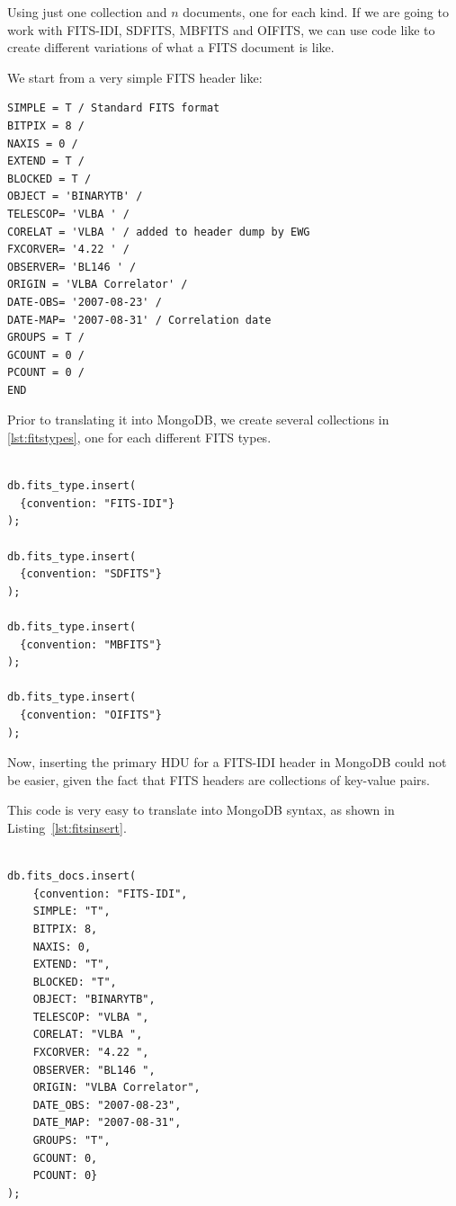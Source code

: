 Using just one collection and $n$ documents, one for each kind. If we are going to work with FITS-IDI, SDFITS, MBFITS and OIFITS, we can use code like to create different variations of what a FITS document is like.

We start from a very simple FITS header like: 

\begin{lstlisting}[float,label=lst:fitsheader,caption=FITS sample.]
SIMPLE = T / Standard FITS format
BITPIX = 8 /
NAXIS = 0 /
EXTEND = T /
BLOCKED = T /
OBJECT = 'BINARYTB' /
TELESCOP= 'VLBA ' /
CORELAT = 'VLBA ' / added to header dump by EWG
FXCORVER= '4.22 ' /
OBSERVER= 'BL146 ' /
ORIGIN = 'VLBA Correlator' /
DATE-OBS= '2007-08-23' /
DATE-MAP= '2007-08-31' / Correlation date
GROUPS = T /
GCOUNT = 0 /
PCOUNT = 0 /
END
\end{lstlisting}

Prior to translating it into MongoDB, we create several collections in \ref{lst:fitstypes}, one for each different FITS types.

\begin{lstlisting}[float,label=lst:fitstypes,caption=MongoDB BSON code for creating the different FITS document types.]

db.fits_type.insert(
  {convention: "FITS-IDI"}
);

db.fits_type.insert(
  {convention: "SDFITS"}
);

db.fits_type.insert(
  {convention: "MBFITS"}
);

db.fits_type.insert(
  {convention: "OIFITS"}
);

\end{lstlisting}


Now, inserting the primary HDU for a  FITS-IDI header in MongoDB could not be
easier, given the fact that FITS headers are collections of key-value pairs. %

This code is very easy to translate into MongoDB syntax, as shown in Listing~\ref{lst:fitsinsert}.

\begin{lstlisting}[float,label=lst:fitsinsert,caption=MongoDB BSON code for adding FITS metadata to the NoSQL database.]

db.fits_docs.insert(
    {convention: "FITS-IDI",
    SIMPLE: "T",
    BITPIX: 8,
    NAXIS: 0,
    EXTEND: "T",
    BLOCKED: "T",
    OBJECT: "BINARYTB",
    TELESCOP: "VLBA ",
    CORELAT: "VLBA ",
    FXCORVER: "4.22 ",
    OBSERVER: "BL146 ",
    ORIGIN: "VLBA Correlator",
    DATE_OBS: "2007-08-23",
    DATE_MAP: "2007-08-31",
    GROUPS: "T",
    GCOUNT: 0,
    PCOUNT: 0}
);

\end{lstlisting}

